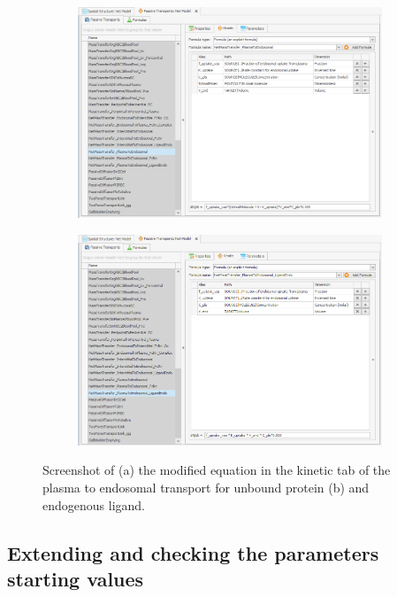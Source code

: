\documentclass[fleqn,10pt]{physiome}
\begin{document}
\begin{figure}[htb]\centering
    \begin{subfigure}{0.49\textwidth}
        \includegraphics[width=\textwidth]{Picture6.png}
        \caption{}
        \label{pic:3a}
    \end{subfigure}
    \hfill
    \begin{subfigure}{0.49\textwidth}
        \includegraphics[width=\textwidth]{Picture7.png}
        \caption{}
        \label{pic:3b}
    \end{subfigure}
    \caption{Screenshot of (a) the modified equation in the kinetic tab of the plasma to endosomal transport for unbound protein (b) and endogenous ligand.}
    \label{pic3}
\end{figure}


\subsection{Extending and checking the parameters starting values}
\end{document}
